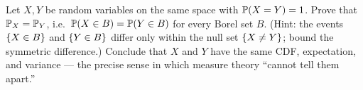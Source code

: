 \begin{exercise}
\label{ch36:ex-as-law}
Let $X, Y$ be random variables on the same space with $\P(X = Y) = 1$. Prove that
$\P_X = \P_Y$, i.e.\ $\P(X \in B) = \P(Y \in B)$ for every Borel set $B$. (Hint:
the events $\set{X \in B}$ and $\set{Y \in B}$ differ only within the null set
$\set{X \ne Y}$; bound the symmetric difference.) Conclude that $X$ and $Y$ have
the same CDF, expectation, and variance --- the precise sense in which measure
theory ``cannot tell them apart.''
\end{exercise}
